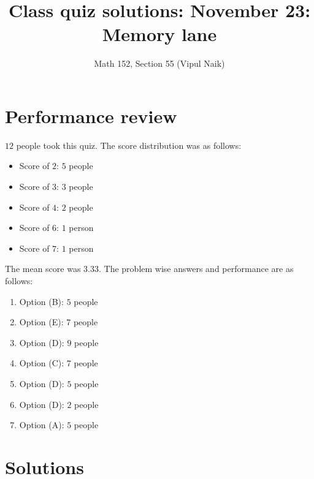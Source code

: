 \documentclass[10pt]{amsart}
\title{Class quiz solutions: November 23: Memory lane}
\author{Math 152, Section 55 (Vipul Naik)}
\begin{document}
\maketitle

\section{Performance review}

$12$ people took this quiz. The score distribution was as follows:

\begin{itemize}
\item Score of $2$: $5$ people
\item Score of $3$: $3$ people
\item Score of $4$: $2$ people
\item Score of $6$: $1$ person
\item Score of $7$: $1$ person
\end{itemize}

The mean score was $3.33$. The problem wise answers and performance
are as follows:

\begin{enumerate}
\item Option (B): $5$ people
\item Option (E): $7$ people
\item Option (D): $9$ people
\item Option (C): $7$ people
\item Option (D): $5$ people
\item Option (D): $2$ people
\item Option (A): $5$ people
\end{enumerate}

\section{Solutions}
\end{document}
